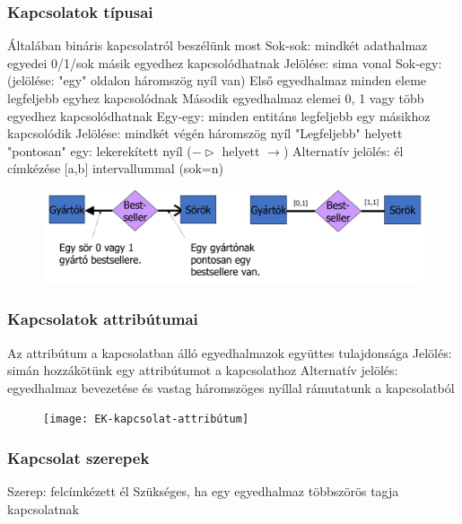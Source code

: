 \documentclass[12pt,a4paper]{article}
\begin{document}
\subsubsection{Kapcsolatok típusai}

\begin{outline}
	\1 Általában bináris kapcsolatról beszélünk most
	\1 Sok-sok: mindkét adathalmaz egyedei 0/1/sok másik egyedhez kapcsolódhatnak
		\2 Jelölése: sima vonal
	\1 Sok-egy: (jelölése: "egy" oldalon háromszög nyíl van)
		\2 Első egyedhalmaz minden eleme legfeljebb egyhez kapcsolódnak
		\2 Második egyedhalmaz elemei 0, 1 vagy több egyedhez kapcsolódhatnak
	\1 Egy-egy: minden entitáns legfeljebb egy másikhoz kapcsolódik
		\2 Jelölése: mindkét végén háromszög nyíl
	\1 "Legfeljebb" helyett "pontosan" egy: lekerekített nyíl ($-\triangleright$ helyett $\to$)
	\1 Alternatív jelölés: él címkézése [a,b] intervallummal (sok=n)
\end{outline}

\begin{figure}[h!]
	\centering
	\includegraphics[width=0.5\linewidth]{EK-kapcsolat}
\end{figure}

\subsubsection{Kapcsolatok attribútumai}

\begin{outline}
	\1 Az attribútum a kapcsolatban álló egyedhalmazok együttes tulajdonsága
	\1 Jelölés: simán hozzákötünk egy attribútumot a kapcsolathoz
	\1 Alternatív jelölés: egyedhalmaz bevezetése és vastag háromszöges nyíllal rámutatunk a kapcsolatból
\end{outline}

\begin{figure}[h!]
	\centering
	\texttt{[image: EK-kapcsolat-attribútum]}
\end{figure}

\subsubsection{Kapcsolat szerepek}

\begin{outline}
	\1 Szerep: felcímkézett él
	\1 Szükséges, ha egy egyedhalmaz többszörös tagja kapcsolatnak
\end{outline}
\end{document}
